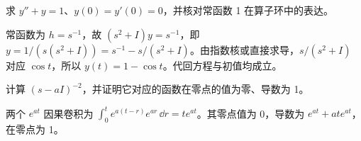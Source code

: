 \begin{exercise}[二阶方程]\label{ex:y6-ode}
求 $y''+y=1$、$y(0)=y'(0)=0$，并核对常函数 1 在算子环中的表达。
\end{exercise}
\begin{solution}
常函数为 $h=s^{-1}$，故 $(s^2+I)y=s^{-1}$，即 $y=1/(s(s^2+I))=s^{-1}-s/(s^2+I)$。由指数核或直接求导，$s/(s^2+I)$ 对应 $\cos t$，所以 $y(t)=1-\cos t$。代回方程与初值均成立。
\end{solution}

\begin{exercise}[重复根]\label{ex:y6-repeated-root}
计算 $(s-aI)^{-2}$，并证明它对应的函数在零点的值为零、导数为 1。
\end{exercise}
\begin{solution}
两个 $e^{at}$ 因果卷积为 $\int_0^te^{a(t-r)}e^{ar}\,\dd r=te^{at}$。其零点值为 0，导数为 $e^{at}+ate^{at}$，在零点为 1。
\end{solution}
